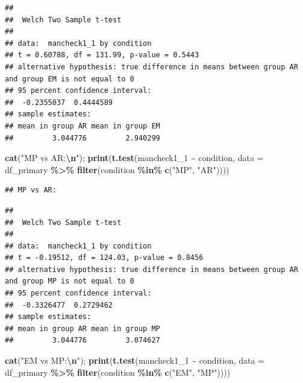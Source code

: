 \documentclass[
]{article}
\newenvironment{Shaded}{\begin{snugshade}}{\end{snugshade}}
\newcommand{\AttributeTok}[1]{\textcolor[rgb]{0.13,0.29,0.53}{#1}}
\newcommand{\FunctionTok}[1]{\textcolor[rgb]{0.13,0.29,0.53}{\textbf{#1}}}
\newcommand{\NormalTok}[1]{#1}
\newcommand{\SpecialCharTok}[1]{\textcolor[rgb]{0.81,0.36,0.00}{\textbf{#1}}}
\newcommand{\StringTok}[1]{\textcolor[rgb]{0.31,0.60,0.02}{#1}}
\begin{document}
\begin{verbatim}
## 
##  Welch Two Sample t-test
## 
## data:  mancheck1_1 by condition
## t = 0.60788, df = 131.99, p-value = 0.5443
## alternative hypothesis: true difference in means between group AR and group EM is not equal to 0
## 95 percent confidence interval:
##  -0.2355037  0.4444589
## sample estimates:
## mean in group AR mean in group EM 
##         3.044776         2.940299
\end{verbatim}

\begin{Shaded}
\begin{Highlighting}[]
\FunctionTok{cat}\NormalTok{(}\StringTok{"MP vs AR:}\SpecialCharTok{\textbackslash{}n}\StringTok{"}\NormalTok{); }\FunctionTok{print}\NormalTok{(}\FunctionTok{t.test}\NormalTok{(mancheck1\_1 }\SpecialCharTok{\textasciitilde{}}\NormalTok{ condition, }
       \AttributeTok{data =}\NormalTok{ df\_primary }\SpecialCharTok{\%\textgreater{}\%} \FunctionTok{filter}\NormalTok{(condition }\SpecialCharTok{\%in\%} \FunctionTok{c}\NormalTok{(}\StringTok{"MP"}\NormalTok{, }\StringTok{"AR"}\NormalTok{))))}
\end{Highlighting}
\end{Shaded}

\begin{verbatim}
## MP vs AR:
\end{verbatim}

\begin{verbatim}
## 
##  Welch Two Sample t-test
## 
## data:  mancheck1_1 by condition
## t = -0.19512, df = 124.03, p-value = 0.8456
## alternative hypothesis: true difference in means between group AR and group MP is not equal to 0
## 95 percent confidence interval:
##  -0.3326477  0.2729462
## sample estimates:
## mean in group AR mean in group MP 
##         3.044776         3.074627
\end{verbatim}

\begin{Shaded}
\begin{Highlighting}[]
\FunctionTok{cat}\NormalTok{(}\StringTok{"EM vs MP:}\SpecialCharTok{\textbackslash{}n}\StringTok{"}\NormalTok{); }\FunctionTok{print}\NormalTok{(}\FunctionTok{t.test}\NormalTok{(mancheck1\_1 }\SpecialCharTok{\textasciitilde{}}\NormalTok{ condition, }
       \AttributeTok{data =}\NormalTok{ df\_primary }\SpecialCharTok{\%\textgreater{}\%} \FunctionTok{filter}\NormalTok{(condition }\SpecialCharTok{\%in\%} \FunctionTok{c}\NormalTok{(}\StringTok{"EM"}\NormalTok{, }\StringTok{"MP"}\NormalTok{))))}
\end{Highlighting}
\end{Shaded}
\end{document}
